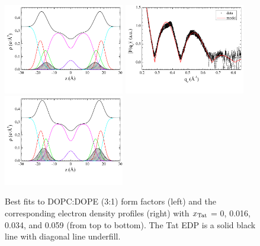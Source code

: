 \begin{figure}[htbp]
  \includegraphics[trim=5 30 0 0,clip=true,width=0.47\textwidth]{figures/Tat/SDP_Results/EDP/DOPCDOPE3to1_Tat_28to1_3p0_EDP1}
  \includegraphics[trim=5 30 0 0,clip=true,width=0.47\textwidth]{figures/Tat/SDP_Results/XFF/DOPCDOPE3to1_Tat_16to1_3p0_XFF1}
  \includegraphics[trim=5 30 0 0,clip=true,width=0.47\textwidth]{figures/Tat/SDP_Results/EDP/DOPCDOPE3to1_Tat_16to1_3p0_EDP1} 
  \caption{Best fits to DOPC:DOPE (3:1) form factors (left) and the corresponding 
  electron density profiles (right) with $x_\textrm{Tat}$ = 0, 0.016, 0.034, 
  and 0.059 (from top to bottom).
  The Tat EDP is a solid black line with diagonal line underfill.}
  \label{fig:DOPCDOPE3to1_Tat_XFF1}
\end{figure}

